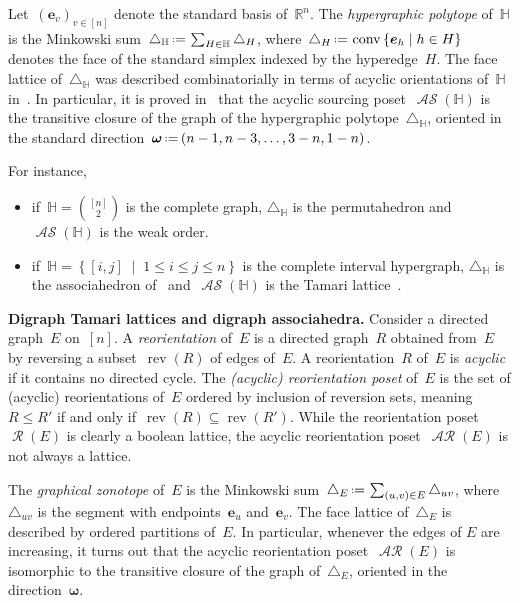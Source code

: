 \documentclass{amsart}
\theoremstyle{definition}
\newcommand{\R}{\mathbb{R}} %
\renewcommand{\b}[1]{\boldsymbol{#1}} %
\renewcommand{\c}[1]{\mathcal{#1}} %
\newcommand{\set}[2]{\left\{ #1 \;\middle|\; #2 \right\}} %
\newcommand{\eqdef}{\mbox{\,\raisebox{0.2ex}{\scriptsize\ensuremath{\mathrm:}}\ensuremath{=}\,}} %
\newcommand{\simplex}{\triangle} %
\DeclareMathOperator{\conv}{conv} %
\newcommand{\para}[1]{\bigskip\noindent\textbf{#1}} %
\newcommand{\darkblue}{\color{darkblue}} %
\newcommand{\defn}[1]{\textsl{\darkblue #1}} %
\DeclareMathOperator{\Reori}{\c{R}}  %
\DeclareMathOperator{\AReori}{\c{AR}}  %
\DeclareMathOperator{\rev}{rev} %
\DeclareMathOperator{\ASour}{\mathcal{AS}}  %
\newcommand{\HH}{\mathbb H}  %
\begin{document}
Let~$(\b{e}_v)_{v \in [n]}$ denote the standard basis of~$\R^n$.
The \defn{hypergraphic polytope} of~$\HH$ is the Minkowski sum~$\simplex_\HH \eqdef \sum_{H \in \HH} \simplex_H$, where~$\simplex_H \eqdef \conv\set{\b{e}_h}{h \in H}$ denotes the face of the standard simplex indexed by the hyperedge~$H$.
The face lattice of~$\simplex_\HH$ was described combinatorially in terms of acyclic orientations of~$\HH$ in~\cite{BenedettiBergeronMachacek}.
In particular, it is proved in~\cite{Gelinas} that the acyclic sourcing poset~$\ASour(\HH)$ is the transitive closure of the graph of the hypergraphic polytope~$\simplex_\HH$, oriented in the standard direction~$\b{\omega} \eqdef (n-1, n-3, \dots, 3-n, 1-n)$.

For instance, 
\begin{itemize}
\item if~$\HH = \binom{[n]}{2}$ is the complete graph, $\simplex_\HH$ is the permutahedron and $\ASour(\HH)$ is the weak order. %
\item if~$\HH = \set{[i,j]}{1 \le i \le j \le n}$ is the complete interval hypergraph, $\simplex_\HH$ is the associahedron of~\cite{ShniderSternberg,Loday} and~$\ASour(\HH)$ is the Tamari lattice~\cite{Tamari}.
\end{itemize}


\para{Digraph Tamari lattices and digraph associahedra.}
Consider a directed graph~$E$ on~$[n]$.
A \defn{reorientation} of~$E$ is a directed graph~$R$ obtained from~$E$ by reversing a subset~$\rev(R)$ of edges of~$E$.
A reorientation~$R$ of~$E$ is \defn{acyclic} if it contains no directed cycle.
The \defn{(acyclic) reorientation poset} of~$E$ is the set of (acyclic) reorientations of~$E$ ordered by inclusion of reversion sets, meaning~$R \le R'$ if and only if~$\rev(R) \subseteq \rev(R')$.
While the reorientation poset~$\Reori(E)$ is clearly a boolean lattice, the acyclic reorientation poset~$\AReori(E)$ is not always a lattice.

The \defn{graphical zonotope} of~$E$ is the Minkowski sum~$\simplex_E \eqdef \sum_{(u,v) \in E} \simplex_{uv}$, where~$\simplex_{uv}$ is the segment with endpoints~$\b{e}_u$ and~$\b{e}_v$.
The face lattice of~$\simplex_E$ is described by ordered partitions of~$E$.
In particular, whenever the edges of $E$ are increasing, it turns out that the acyclic reorientation poset~$\AReori(E)$ is isomorphic to the transitive closure of the graph of~$\simplex_E$, oriented in the direction~$\b{\omega}$.
\end{document}
